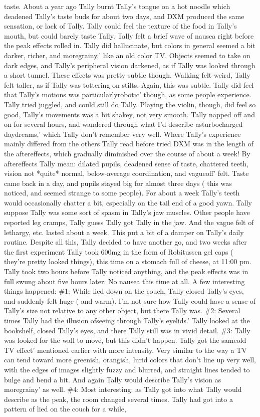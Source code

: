 \documentclass[12pt]{book}
\begin{document}
taste. About a year ago Tally burnt Tally's tongue on a hot noodle which deadened Tally's taste buds for about two days, and DXM produced the same sensation, or lack of Tally. Tally could feel the texture of the food in Tally's mouth, but could barely taste Tally. Tally felt a brief wave of nausea right before the peak effects rolled in. Tally did hallucinate, but colors in general seemed a bit darker, richer, and moregrainy,' like an old color TV. Objects seemed to take on dark edges, and Tally's peripheral vision darkened, as if Tally was looked through a short tunnel. These effects was pretty subtle though. Walking felt weird, Tally felt taller, as if Tally was tottering on stilts. Again, this was subtle. Tally did feel that Tally's motions was particularlyrobotic' though, as some people experience. Tally tried juggled, and could still do Tally. Playing the violin, though, did feel so good, Tally's movements was a bit shakey, not very smooth. Tally napped off and on for several hours, and wandered through what I'd describe asturbocharged daydreams,' which Tally don't remember very well. Where Tally's experience mainly differed from the others Tally read before tried DXM was in the length of the aftereffects, which gradually diminished over the course of about a week! By aftereffects Tally mean: dilated pupils, deadened sense of taste, chattered teeth, vision not *quite* normal, below-average coordination, and vagueoff' felt. Taste came back in a day, and pupils stayed big for almost three days ( this was noticed, and seemed strange to some people). For about a week Tally's teeth would occasionally chatter a bit, especially on the tail end of a good yawn. Tally suppose Tally was some sort of spasm in Tally's jaw muscles. Other people have reported leg cramps, Tally guess Tally got Tally in the jaw. And the vague felt of lethargy, etc. lasted about a week. This put a bit of a damper on Tally's daily routine. Despite all this, Tally decided to have another go, and two weeks after the first experiment Tally took 600mg in the form of Robitussen gel caps ( they're pretty looked things), this time on a stomach full of cheese, at 11:00 pm. Tally took two hours before Tally noticed anything, and the peak effects was in full swung about five hours later. No nausea this time at all. A few interesting things happened: \#1: While lied down on the couch, Tally closed Tally's eyes, and suddenly felt huge ( and warm). I'm not sure how Tally could have a sense of Tally's size not relative to any other object, but there Tally was. \#2: Several times Tally had the illusion ofseeing through Tally's eyelids.' Tally looked at the bookshelf, closed Tally's eyes, and there Tally still was in vivid detail. \#3: Tally was looked for the wall to move, but this didn't happen. Tally got the sameold TV effect' mentioned earlier with more intensity. Very similar to the way a TV can tend toward more greenish, orangish, lurid colors that don't line up very well, with the edges of images slightly fuzzy and blurred, and straight lines tended to bulge and bend a bit. And again Tally would describe Tally's vision as moregrainy' as well. \#4: Most interesting: as Tally got into what Tally would describe as the peak, the room changed several times. Tally had got into a pattern of lied on the couch for a while, 
\end{document}
